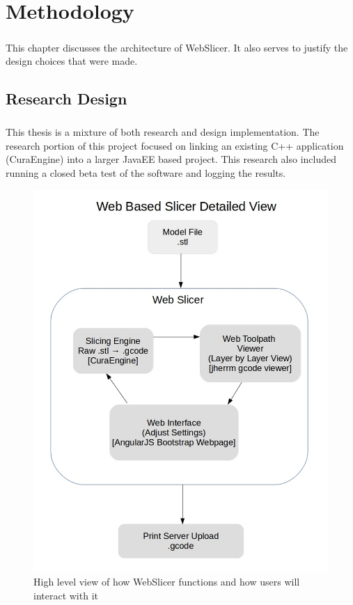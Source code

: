 \chapter{Methodology}
\paragraph{}
This chapter discusses the architecture of WebSlicer. It also serves to justify the design choices that were made. 

\section{Research Design} 
\paragraph{}
This thesis is a mixture of both research and design implementation.
The research portion of this project focused on linking an existing C++ application (CuraEngine) into a larger JavaEE based project.
This research also included running a closed beta test of the software and logging the results.

\begin{figure}[!ht]
  \centering
  \includegraphics[width=\linewidth]{diagrams/slicer-detailed-view}
  \caption{High level view of how WebSlicer functions and how users will interact with it}
  \label{fig:slicer-detailed-view}
\end{figure}

